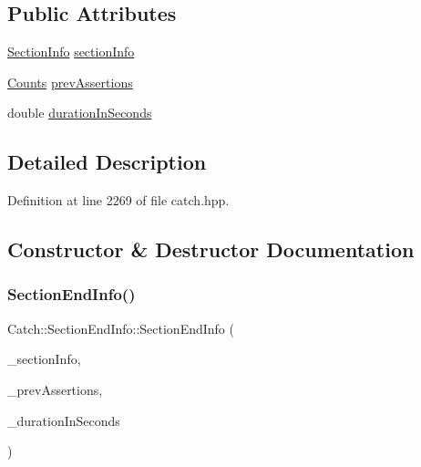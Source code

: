 \subsection*{Public Attributes}
\begin{DoxyCompactItemize}
\item 
\hyperlink{struct_catch_1_1_section_info}{Section\+Info} \hyperlink{struct_catch_1_1_section_end_info_a2d44793392cb83735d086d726822abe9}{section\+Info}
\item 
\hyperlink{struct_catch_1_1_counts}{Counts} \hyperlink{struct_catch_1_1_section_end_info_ae70b154cbc05b5dd2901d97f89303d8c}{prev\+Assertions}
\item 
double \hyperlink{struct_catch_1_1_section_end_info_a7c262f2dab9cff166b8eca620c47eea5}{duration\+In\+Seconds}
\end{DoxyCompactItemize}


\subsection{Detailed Description}


Definition at line 2269 of file catch.\+hpp.



\subsection{Constructor \& Destructor Documentation}
\hypertarget{struct_catch_1_1_section_end_info_abc9381c7c22b6907317ec985ccaa6713}{}\label{struct_catch_1_1_section_end_info_abc9381c7c22b6907317ec985ccaa6713} 
\subsubsection{\texorpdfstring{Section\+End\+Info()}{SectionEndInfo()}}
{\footnotesize\ttfamily Catch\+::\+Section\+End\+Info\+::\+Section\+End\+Info (\begin{DoxyParamCaption}\item[{\hyperlink{struct_catch_1_1_section_info}{Section\+Info} const \&}]{\+\_\+section\+Info,  }\item[{\hyperlink{struct_catch_1_1_counts}{Counts} const \&}]{\+\_\+prev\+Assertions,  }\item[{double}]{\+\_\+duration\+In\+Seconds }\end{DoxyParamCaption})\hspace{0.3cm}{\ttfamily [inline]}}



